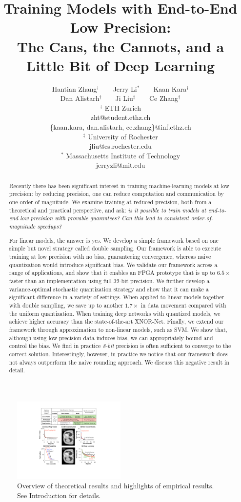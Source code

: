 \documentclass{article}
\title{ \bf
Training Models with End-to-End Low Precision:\\
The Cans, the Cannots, and a Little Bit of Deep Learning
}
\author{
\small Hantian Zhang$^\dag$~~~~Jerry Li$^\ast$~~~~Kaan Kara$^\dag$\\
\small Dan Alistarh$^\dag$~~~~Ji Liu$^\ddag$~~~~Ce Zhang$^\dag$\\
\small $^\dag$ ETH Zurich\\
\small zht@student.ethz.ch\\
\small \{kaan.kara, dan.alistarh, ce.zhang\}@inf.ethz.ch\\
\small $^\ddag$ University of Rochester\\
\small jliu@cs.rochester.edu\\
\small $^\ast$ Massachusetts Institute of Technology\\
\small jerryzli@mit.edu
}
\date{}
\begin{document}
\maketitle

\begin{abstract}

Recently there has been significant interest in training 
machine-learning models at low precision: by reducing 
precision, one can reduce computation and communication by one order of magnitude. 
We examine training at reduced precision, both from a theoretical and practical 
perspective, and ask: 
{\em is it possible to \emph{train} models at end-to-end low 
precision with \emph{provable} guarantees? Can this 
lead to consistent order-of-magnitude speedups?}

For linear models, the answer is yes. We develop a simple 
framework based on one simple but novel strategy called double sampling. 
Our framework is able 
to execute training at low precision with no bias, 
guaranteeing convergence, whereas naive quantization 
would introduce significant bias. We validate our framework   
across a range of applications, and show that it enables an 
FPGA prototype that is up to $6.5\times$ faster 
than an implementation using full 32-bit precision.
We further develop a variance-optimal 
stochastic quantization
strategy and show that 
it can make a significant difference in a variety of settings. 
When applied to linear models together with 
double sampling, we save up to another 
$1.7\times$ in data movement compared with the uniform quantization. 
When
training deep networks with quantized models, 
we achieve higher accuracy than the state-of-the-art XNOR-Net. 
Finally, we extend our framework through approximation to non-linear 
models, such as SVM. We show that, although using low-precision data induces bias, 
we can appropriately 
bound and control the bias. We find in practice {\em 8-bit} 
precision is often sufficient to converge to the correct solution. 
Interestingly, however, in practice we notice that our framework does not always outperform the naive rounding approach. We discuss this negative result in detail. 


\end{abstract}

\begin{figure}[t]
\centering
\includegraphics[width=0.5\textwidth]{Figures/RSHighlight}    
\caption{Overview of theoretical results and
highlights of empirical results. See
Introduction for details.}
\label{fig:highlight}
\end{figure}
\end{document}
